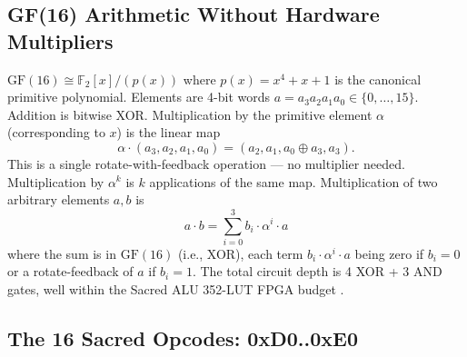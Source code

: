 \subsection{GF(16) Arithmetic Without Hardware Multipliers}
\label{subsec:71:gf16-arith}

$\mathrm{GF}(16) \cong \mathbb{F}_2[x]/(p(x))$ where
$p(x) = x^4 + x + 1$ is the canonical primitive polynomial.
Elements are 4-bit words $a = a_3 a_2 a_1 a_0 \in \{0,\ldots,15\}$.
Addition is bitwise XOR.  Multiplication by the primitive element
$\alpha$ (corresponding to $x$) is the linear map
\[
  \alpha \cdot (a_3, a_2, a_1, a_0)
  = (a_2, a_1, a_0 \oplus a_3, a_3).
\]
This is a single rotate-with-feedback operation — no multiplier needed.
Multiplication by $\alpha^k$ is $k$ applications of the same map.
Multiplication of two arbitrary elements $a, b$ is
\[
  a \cdot b = \sum_{i=0}^{3} b_i \cdot \alpha^i \cdot a
\]
where the sum is in $\mathrm{GF}(16)$ (i.e., XOR), each term $b_i \cdot \alpha^i \cdot a$
being zero if $b_i = 0$ or a rotate-feedback of $a$ if $b_i = 1$.
The total circuit depth is 4 XOR + 3 AND gates, well within the
Sacred ALU 352-LUT FPGA budget \cite{xilinx2022ultrascale}.

\subsection{The 16 Sacred Opcodes: 0xD0..0xE0}
\label{subsec:71:opcodes}

